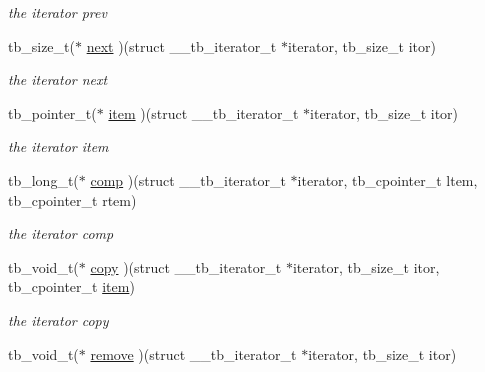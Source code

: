\begin{DoxyCompactItemize}
\begin{DoxyCompactList}\small\item\em the iterator prev \end{DoxyCompactList}\item 
\hypertarget{structtb__iterator__t_ac7840be6d4d222c4f11c9a6089a1dc81}{tb\-\_\-size\-\_\-t($\ast$ \hyperlink{structtb__iterator__t_ac7840be6d4d222c4f11c9a6089a1dc81}{next} )(struct \-\_\-\-\_\-tb\-\_\-iterator\-\_\-t $\ast$iterator, tb\-\_\-size\-\_\-t itor)}\label{structtb__iterator__t_ac7840be6d4d222c4f11c9a6089a1dc81}

\begin{DoxyCompactList}\small\item\em the iterator next \end{DoxyCompactList}\item 
\hypertarget{structtb__iterator__t_afd298c5f7f8ce4ab669f8b1bd35401f7}{tb\-\_\-pointer\-\_\-t($\ast$ \hyperlink{structtb__iterator__t_afd298c5f7f8ce4ab669f8b1bd35401f7}{item} )(struct \-\_\-\-\_\-tb\-\_\-iterator\-\_\-t $\ast$iterator, tb\-\_\-size\-\_\-t itor)}\label{structtb__iterator__t_afd298c5f7f8ce4ab669f8b1bd35401f7}

\begin{DoxyCompactList}\small\item\em the iterator item \end{DoxyCompactList}\item 
\hypertarget{structtb__iterator__t_a021818f7768feeee813f664840b6f172}{tb\-\_\-long\-\_\-t($\ast$ \hyperlink{structtb__iterator__t_a021818f7768feeee813f664840b6f172}{comp} )(struct \-\_\-\-\_\-tb\-\_\-iterator\-\_\-t $\ast$iterator, tb\-\_\-cpointer\-\_\-t ltem, tb\-\_\-cpointer\-\_\-t rtem)}\label{structtb__iterator__t_a021818f7768feeee813f664840b6f172}

\begin{DoxyCompactList}\small\item\em the iterator comp \end{DoxyCompactList}\item 
\hypertarget{structtb__iterator__t_a3db62775bc728c6647de3c9e1d1b8fc3}{tb\-\_\-void\-\_\-t($\ast$ \hyperlink{structtb__iterator__t_a3db62775bc728c6647de3c9e1d1b8fc3}{copy} )(struct \-\_\-\-\_\-tb\-\_\-iterator\-\_\-t $\ast$iterator, tb\-\_\-size\-\_\-t itor, tb\-\_\-cpointer\-\_\-t \hyperlink{structtb__iterator__t_afd298c5f7f8ce4ab669f8b1bd35401f7}{item})}\label{structtb__iterator__t_a3db62775bc728c6647de3c9e1d1b8fc3}

\begin{DoxyCompactList}\small\item\em the iterator copy \end{DoxyCompactList}\item 
\hypertarget{structtb__iterator__t_a0c442a052a29a2c2ecb327c9d55f2bc0}{tb\-\_\-void\-\_\-t($\ast$ \hyperlink{structtb__iterator__t_a0c442a052a29a2c2ecb327c9d55f2bc0}{remove} )(struct \-\_\-\-\_\-tb\-\_\-iterator\-\_\-t $\ast$iterator, tb\-\_\-size\-\_\-t itor)}\label{structtb__iterator__t_a0c442a052a29a2c2ecb327c9d55f2bc0}


\end{DoxyCompactItemize}
